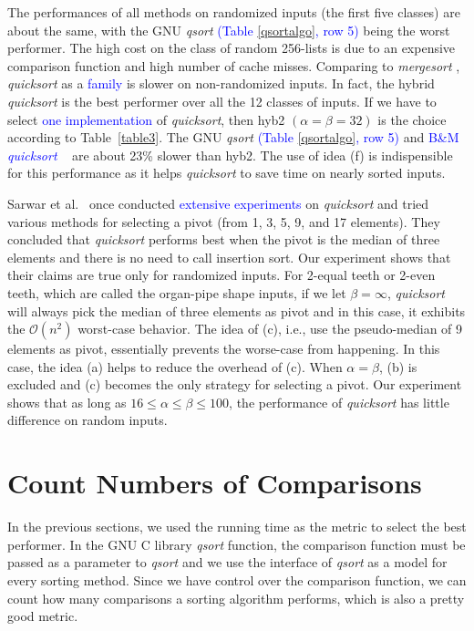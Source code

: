 \documentclass[AMA,STIX1COL]{WileyNJD-v2}
\newcommand{\qusort}{\emph{quicksort }}
\newcommand{\qusortn}{\emph{quicksort}}
\newcommand{\qsort}{\emph{qsort }}
\newcommand{\msort}{\emph{mergesort }}
\begin{document}
The performances of all methods on randomized inputs (the first five classes) are about the same, with the GNU \qsort \textcolor{blue}{(Table \ref{qsortalgo}, row 5)} being the worst performer. 
The high cost on the class of random 256-lists is due to an expensive comparison function and high number of cache misses. 
Comparing to \msort, \qusort as a \textcolor{blue}{family} is slower on non-randomized inputs. 
In fact, the hybrid \qusort is the best performer over all the 12 classes of inputs. 
If we have to select \textcolor{blue}{one implementation} of \qusortn, then hyb2 $(\alpha = \beta = 32)$ is the choice according to Table~\ref{table3}. 
The GNU \qsort \textcolor{blue}{(Table \ref{qsortalgo}, row 5)} and \textcolor{blue}{B\&M \qusort~\cite{bentley1993engineering}} are about 23\% slower than hyb2. 
The use of idea (f) is indispensible for this performance as it helps \qusort to save time on nearly sorted inputs. 

Sarwar et al.~\cite{sarwar1996engineering} once conducted \textcolor{blue}{extensive experiments} on \qusort and tried various methods for selecting a pivot (from 1, 3, 5, 9, and 17 elements). 
They concluded that \qusort performs best when the pivot is the median of three elements and there is no need to call insertion sort. 
Our experiment shows that their claims are true only for randomized inputs. 
For 2-equal teeth or 2-even teeth, which are called the organ-pipe shape inputs, if we let $\beta = \infty$, \qusort will always pick the median of three elements as pivot and in this case, it exhibits the $\mathcal{O}(n^2)$ worst-case behavior. 
The idea of (c), i.e., use the pseudo-median of 9 elements as pivot, essentially prevents the worse-case from happening. 
In this case, the idea (a) helps to reduce the overhead of (c). When $\alpha = \beta$, (b) is excluded and (c) becomes the only strategy for selecting a pivot. 
Our experiment shows that as long as $16 \leq \alpha \leq \beta \leq 100$, the performance of \qusort has little difference on random inputs.

\section{Count Numbers of Comparisons} 
In the previous sections, we used the running time as the metric to select the best performer. 
In the GNU C library \qsort function, the comparison function must be passed as a parameter to \qsort and we use the interface of \qsort as a model for every sorting method. 
Since we have control over the comparison function, we can count how many comparisons a sorting algorithm performs, which is also a pretty good metric.
\end{document}
